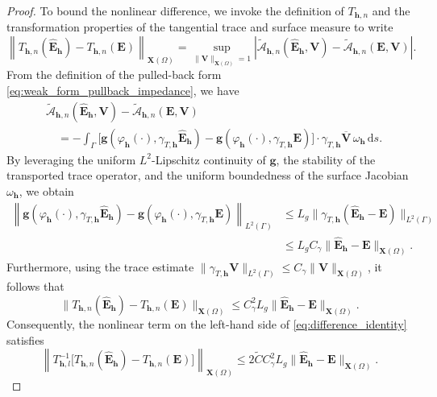 \documentclass[10pt,a4paper]{amsart}
\numberwithin{equation}{section}
\begin{document}
\begin{proof}
To bound the nonlinear difference, we invoke the definition of $T_{\mathbf{h},n}$ and the transformation properties of the tangential trace and surface measure to write
\[
\left\| T_{\mathbf{h},n}(\hat{\mathbf{E}}_{\mathbf{h}}) - T_{\mathbf{h},n}(\mathbf{E}) \right\|_{\mathbf{X}(\Omega)} = \sup_{\|\mathbf{V}\|_{\mathbf{X}(\Omega)}=1} \left| \widetilde{\mathcal{A}}_{\mathbf{h},n}(\hat{\mathbf{E}}_{\mathbf{h}}, \mathbf{V}) - \widetilde{\mathcal{A}}_{\mathbf{h},n}(\mathbf{E}, \mathbf{V}) \right|.
\]
From the definition of the pulled-back form \eqref{eq:weak_form_pullback_impedance}, we have
\[
\begin{aligned}
&\widetilde{\mathcal{A}}_{\mathbf{h},n}(\hat{\mathbf{E}}_{\mathbf{h}}, \mathbf{V}) - \widetilde{\mathcal{A}}_{\mathbf{h},n}(\mathbf{E}, \mathbf{V}) \\
&\quad = - \int_\Gamma \Big[ \mathbf{g}(\varphi_{\mathbf{h}}(\cdot), \gamma_{T,\mathbf{h}} \hat{\mathbf{E}}_{\mathbf{h}}) - \mathbf{g}(\varphi_{\mathbf{h}}(\cdot), \gamma_{T,\mathbf{h}} \mathbf{E}) \Big] \cdot \gamma_{T,\mathbf{h}} \overline{\mathbf{V}} \, \omega_{\mathbf{h}} \, \mathrm{d}s.
\end{aligned}
\]
By leveraging the uniform $L^2$-Lipschitz continuity of $\mathbf{g}$, the stability of the transported trace operator, and the uniform boundedness of the surface Jacobian $\omega_{\mathbf{h}}$, we obtain
\[
\begin{aligned}
\left\| \mathbf{g}(\varphi_{\mathbf{h}}(\cdot), \gamma_{T,\mathbf{h}} \hat{\mathbf{E}}_{\mathbf{h}}) - \mathbf{g}(\varphi_{\mathbf{h}}(\cdot), \gamma_{T,\mathbf{h}} \mathbf{E}) \right\|_{L^2(\Gamma)} &\le L_g \|\gamma_{T,\mathbf{h}} (\hat{\mathbf{E}}_{\mathbf{h}} - \mathbf{E})\|_{L^2(\Gamma)} \\
&\le L_g C_\gamma \|\hat{\mathbf{E}}_{\mathbf{h}} - \mathbf{E}\|_{\mathbf{X}(\Omega)}.
\end{aligned}
\]
Furthermore, using the trace estimate $\|\gamma_{T,\mathbf{h}} \mathbf{V}\|_{L^2(\Gamma)} \le C_\gamma \|\mathbf{V}\|_{\mathbf{X}(\Omega)}$, it follows that
\[
\|T_{\mathbf{h},n}(\hat{\mathbf{E}}_{\mathbf{h}}) - T_{\mathbf{h},n}(\mathbf{E})\|_{\mathbf{X}(\Omega)} \le C_\gamma^2 L_g \|\hat{\mathbf{E}}_{\mathbf{h}} - \mathbf{E}\|_{\mathbf{X}(\Omega)}.
\]
Consequently, the nonlinear term on the left-hand side of \eqref{eq:difference_identity} satisfies
\[
\left\| T_{\mathbf{h},l}^{-1} \big[ T_{\mathbf{h},n}(\hat{\mathbf{E}}_{\mathbf{h}}) - T_{\mathbf{h},n}(\mathbf{E}) \big] \right\|_{\mathbf{X}(\Omega)} \le 2\widetilde{C} C_\gamma^2 L_g \|\hat{\mathbf{E}}_{\mathbf{h}} - \mathbf{E}\|_{\mathbf{X}(\Omega)}.
\]


\end{proof}
\end{document}
